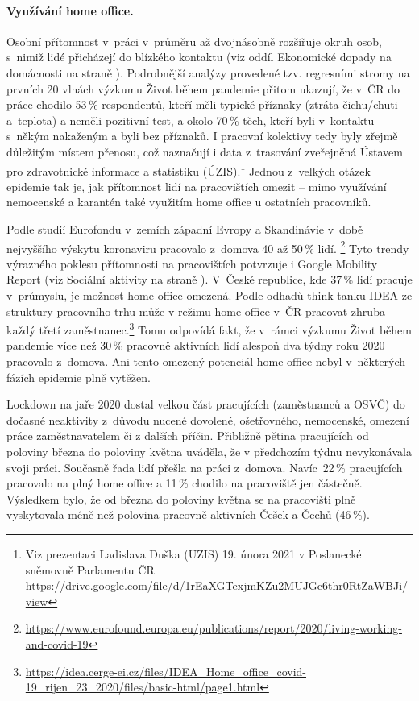 \paragraph{Využívání home office.} Osobní přítomnost v práci v průměru až dvojnásobně rozšiřuje okruh osob, s nimiž lidé přicházejí do blízkého kontaktu (viz oddíl Ekonomické dopady na domácnosti na straně \pageref{Ekonomicke_dopady}). Podrobnější analýzy provedené tzv. regresními stromy na prvních 20 vlnách výzkumu Život během pandemie přitom ukazují, že v ČR do práce chodilo 53\,\% respondentů, kteří měli typické příznaky (ztráta čichu/chuti a teplota) a neměli pozitivní test, a okolo 70\,\% těch, kteří byli v kontaktu s někým nakaženým a byli bez příznaků. I pracovní kolektivy tedy byly zřejmě důležitým místem přenosu, což naznačují i data z trasování zveřejněná Ústavem pro zdravotnické informace a statistiku (ÚZIS).\footnote{Viz prezentaci Ladislava Duška (UZIS) 19. února 2021 v Poslanecké sněmovně Parlamentu ČR \url{https://drive.google.com/file/d/1rEaXGTexjmKZu2MUJGc6thr0RtZaWBJi/view}} Jednou z velkých otázek epidemie tak je, jak přítomnost lidí na pracovištích omezit – mimo využívání nemocenské a karantén také využitím home office u ostatních pracovníků.

Podle studií Eurofondu v zemích západní Evropy a Skandinávie v době nejvyššího výskytu koronaviru pracovalo z domova 40 až 50\,\% lidí. \footnote{ \url{https://www.eurofound.europa.eu/publications/report/2020/living-working-and-covid-19}} Tyto trendy výrazného poklesu přítomnosti na pracovištích potvrzuje i Google Mobility Report (viz Sociální aktivity na straně \pageref{Socialni_aktivity}). V České republice, kde 37\,\% lidí pracuje v průmyslu, je možnost home office omezená. Podle odhadů think-tanku IDEA ze struktury pracovního trhu může v režimu home office v ČR pracovat zhruba každý třetí zaměstnanec.\footnote{\url{https://idea.cerge-ei.cz/files/IDEA\_Home\_office\_covid-19\_rijen\_23\_2020/files/basic-html/page1.html}} Tomu odpovídá fakt, že v rámci výzkumu Život během pandemie více než 30\,\% pracovně aktivních lidí alespoň dva týdny roku 2020 pracovalo z domova. Ani tento omezený potenciál home office nebyl v některých fázích epidemie plně vytěžen.

Lockdown na jaře 2020 dostal velkou část pracujících (zaměstnanců a OSVČ) do dočasné neaktivity z důvodu nucené dovolené, ošetřovného, nemocenské, omezení práce zaměstnavatelem či z dalších příčin. Přibližně pětina pracujících od poloviny března do poloviny května uváděla, že v předchozím týdnu nevykonávala svoji práci. Současně řada lidí přešla na práci z domova. Navíc 22\,\% pracujících pracovalo na plný home office a 11\,\% chodilo na pracoviště jen částečně. Výsledkem bylo, že od března do poloviny května se na pracovišti plně vyskytovala méně než polovina pracovně aktivních Češek a Čechů (46\,\%).

